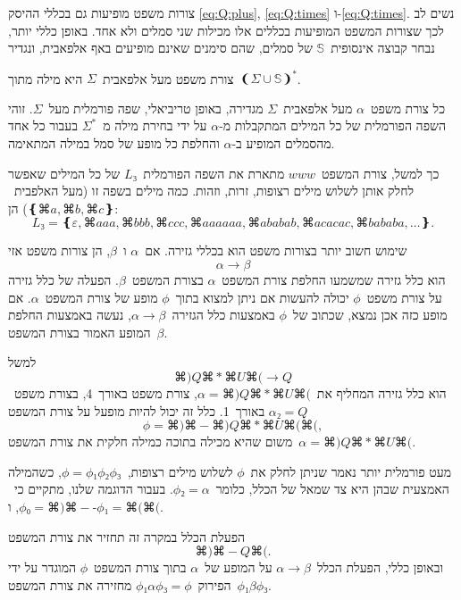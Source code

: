 צורות משפט מופיעות גם בכללי ההיסק \cref{eq:Q:plus}, \cref{eq:Q:times}
ו-\cref{eq:Q:times}. נשים לב לכך שצורות המשפט המופיעות בכללים אלו מכילות שני
סמלים ולא אחד. באופן כללי יותר, נבחר קבוצה אינסופית~$𝕊$ של סמלים, שהם סימנים
שאינם מופיעים באף אלפאבית, ונגדיר

\begin{definition}
  \label{definition:sentential}
  צורת משפט מעל אלפאבית~$Σ$ היא מילה מתוך~$❨Σ∪𝕊❩^*$.
\end{definition}

כל צורת משפט~$α$ מעל אלפאבית~$Σ$ מגדירה, באופן טריביאלי, שפה פורמלית מעל~$Σ$.
זוהי השפה הפורמלית של כל המילים המתקבלות מ-$α$ על ידי בחירת מילה מ~$Σ^*$ בעבור
כל אחד מהסמלים המופיע ב-$α$ והחלפת כל מופע של סמל במילה המתאימה.

כך למשל, צורת המשפט~$www$ מתארת את השפה הפורמלית~$L₃$ של כל המילים שאפשר לחלק
אותן לשלוש מילים רצופות, זרות, וזהות. כמה מילים בשפה זו (מעל
האלפבית~$❴⌘a,⌘b,⌘c❵$) הן:
\begin{equation}
  \label{eq:L3}
  L₃=❴ε, ⌘{aaa}, ⌘{bbb}, ⌘{ccc}, ⌘{aaaaaa}, ⌘{ababab}, ⌘{acacac}, ⌘{bababa},…❵.
\end{equation}

שימוש חשוב יותר בצורות משפט הוא בכללי גזירה. אם~$α$ ו~$β$, הן צורות משפט אזי
\begin{equation*}
  α→β
\end{equation*}
הוא כלל גזירה שמשמעו החלפת צורת המשפט~$α$ בצורת המשפט~$β$. הפעלה של כלל גזירה
על צורת משפט~$ϕ$ יכולה להעשות אם ניתן למצוא בתוך~$ϕ$ מופע של צורת המשפט~$α$.
אם מופע כזה אכן נמצא, שכתוב של~$ϕ$ באמצעות כלל הגזירה~$α→β$, נעשה באמצעות
החלפת המופע האמור בצורת המשפט~$β$.

למשל
\begin{equation*}
  ⌘)Q⌘*⌘U⌘(→Q
\end{equation*}
הוא כלל גזירה המחליף את~$α=⌘)Q⌘*⌘U⌘($, צורת משפט באורך~4, בצורת
משפט~$α₂=Q$ באורך~1. כלל זה יכול להיות
מופעל על צורת המשפט
\begin{equation*}
  ϕ=⌘)⌘-⌘)Q⌘*⌘U⌘(⌘(,
\end{equation*}
משום שהיא מכילה בתוכה כמילה חלקית את צורת המשפט~$α=⌘)Q⌘*⌘U⌘($.

מעט פורמלית יותר נאמר שניתן לחלק את~$ϕ$ לשלוש מילים רצופות,~$ϕ=ϕ₁ϕ₂ϕ₃$, כשהמילה
האמצעית שבהן היא צד שמאל של הכלל, כלומר~$ϕ₂=α$. בעבור הדוגמה שלנו, מתקיים
כי~$ϕ₀=⌘)⌘-$, ו-$ϕ₁=⌘(⌘($.

הפעלת הכלל
במקרה זה תחזיר את צורת המשפט
\begin{equation*}
  ⌘)⌘-Q⌘(.
\end{equation*}
ובאופן כללי, הפעלת הכלל~$α→β$ על המופע של~$α$ בתוך צורת המשפט~$ϕ$ המוגדר על ידי
הפירוק~$ϕ₁αϕ₃=ϕ$ מחזירה את צורת המשפט~$ϕ₁βϕ₃$.

